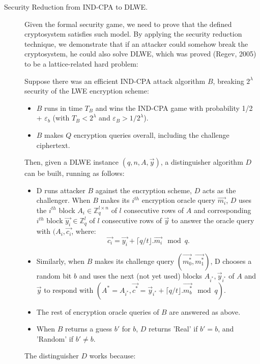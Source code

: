 \begin{description}
\begin{description}
  \item [Security Reduction from IND-CPA to DLWE.] Given the formal security
    game, we need to prove that the defined cryptosystem satisfies such
    model. By applying the security reduction technique, we demonstrate that if
    an attacker could somehow break the cryptosystem, he could also solve
    DLWE, which was proved (Regev, 2005) to be a lattice-related hard problem:

    Suppose there was an efficient IND-CPA attack algorithm $B$, breaking
    $2^\lambda$ security of the LWE encryption scheme:
    \begin{itemize}
    \item $B$ runs in time $T_B$ and wins the IND-CPA game with probability 1/2 +
      $\varepsilon_b$ (with $T_B < 2^\lambda$ and
      $\varepsilon_B > 1/2^\lambda$).
    \item $B$ makes $Q$ encryption queries overall, including the challenge
      ciphertext.
    \end{itemize}
    Then, given a DLWE instance $(q,n,A,\vec{y})$, a distinguisher
    algorithm $D$ can be built, running as follows:
    \begin{itemize}
    \item D runs attacker $B$ against the encryption scheme, $D$ acts as the
      challenger. When $B$ makes its $i^{th}$ encryption oracle query
      $\vec{m_i}$, $D$ uses the $i^{th}$ block
      $A_i \in \mathbb{Z}_q^{l \times n}$ of $l$ consecutive rows of $A$ and
      corresponding $i^{th}$ block $\vec{y_i}\in \mathbb{Z}_q^l$ of $l$
      consecutive rows of $\vec{y}$ to answer the oracle query with
      $(A_i, \vec{c_i}$, where:
      \[
        \vec{c_i} = \vec{y_i} + \lceil q/t \rfloor .  \vec{m_i} \mod q.
      \]
    \item Similarly, when $B$ makes its challenge query
      $(\vec{m_0^*},\vec{m_1^*})$, D chooses a random bit $b$ and uses the next
      (not yet used) blocks $A_{i^*}, \vec{y}_{i^*}$ of $A$ and $\vec{y}$ to
      respond with
      $(A^* = A_{i^*}, \vec{c^*} = \vec{y}_{i^*} + \lceil q/t \rfloor .
      \vec{m_b^*} \mod q)$.
    \item The rest of encryption oracle queries of $B$ are answered as above.
    \item When $B$ returns a guess $b'$ for $b$, $D$ returns 'Real' if $b' = b$,
      and 'Random' if $b' \neq b$.
    \end{itemize}
    The distinguisher $D$ works because:
    \begin{itemize}

\end{itemize}
\end{description}
\end{description}
